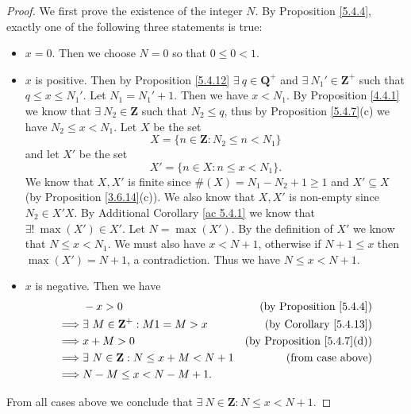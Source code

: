 \begin{proof}
    We first prove the existence of the integer \(N\).
    By Proposition \ref{5.4.4}, exactly one of the following three statements is true:
    \begin{itemize}
        \item \(x = 0\).
              Then we choose \(N = 0\) so that \(0 \leq 0 < 1\).
        \item \(x\) is positive.
              Then by Proposition \ref{5.4.12} \(\exists\ q \in \mathbf{Q}^+\) and \(\exists\ N_1' \in \mathbf{Z}^+\) such that \(q \leq x \leq N_1'\).
              Let \(N_1 = N_1' + 1\).
              Then we have \(x < N_1\).
              By Proposition \ref{4.4.1} we know that \(\exists\ N_2 \in \mathbf{Z}\) such that \(N_2 \leq q\), thus by Proposition \ref{5.4.7}(c) we have \(N_2 \leq x < N_1\).
              Let \(X\) be the set
              \[
                  X = \{n \in \mathbf{Z} : N_2 \leq n < N_1\}
              \]
              and let \(X'\) be the set
              \[
                  X' = \{n \in X : n \leq x < N_1\}.
              \]
              We know that \(X, X'\) is finite since \(\#(X) = N_1 - N_2 + 1 \geq 1\) and \(X' \subseteq X\) (by Proposition \ref{3.6.14}(c)).
              We also know that \(X, X'\) is non-empty since \(N_2 \in X'X\).
              By Additional Corollary \ref{ac 5.4.1} we know that \(\exists!\ \max(X') \in X'\).
              Let \(N = \max(X')\).
              By the definition of \(X'\) we know that \(N \leq x < N_1\).
              We must also have \(x < N + 1\), otherwise if \(N + 1 \leq x\) then \(\max(X') = N + 1\), a contradiction.
              Thus we have \(N \leq x < N + 1\).
        \item \(x\) is negative.
              Then we have
              \begin{align*}
                           & -x > 0                                           & \text{(by Proposition \ref{5.4.4})}    \\
                  \implies & \exists\ M \in \mathbf{Z}^+ : M1 = M > x         & \text{(by Corollary \ref{5.4.13})}     \\
                  \implies & x + M > 0                                        & \text{(by Proposition \ref{5.4.7}(d))} \\
                  \implies & \exists\ N \in \mathbf{Z} : N \leq x + M < N + 1 & \text{(from case above)}               \\
                  \implies & N - M \leq x < N - M + 1.
              \end{align*}
    \end{itemize}
    From all cases above we conclude that \(\exists\ N \in \mathbf{Z} : N \leq x < N + 1\).


\end{proof}
